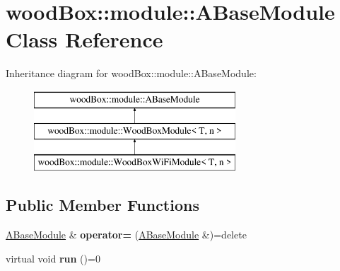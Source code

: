\hypertarget{classwood_box_1_1module_1_1_a_base_module}{}\section{wood\+Box\+:\+:module\+:\+:A\+Base\+Module Class Reference}
\label{classwood_box_1_1module_1_1_a_base_module}
Inheritance diagram for wood\+Box\+:\+:module\+:\+:A\+Base\+Module\+:\begin{figure}[H]
\begin{center}
\leavevmode
\includegraphics[height=3.000000cm]{classwood_box_1_1module_1_1_a_base_module}
\end{center}
\end{figure}
\subsection*{Public Member Functions}
\begin{DoxyCompactItemize}
\item 
\mbox{\label{classwood_box_1_1module_1_1_a_base_module_a61e8f78a69b3ea735e70a13f6de8d662}} 
\mbox{\hyperlink{classwood_box_1_1module_1_1_a_base_module}{A\+Base\+Module}} \& {\bfseries operator=} (\mbox{\hyperlink{classwood_box_1_1module_1_1_a_base_module}{A\+Base\+Module}} \&)=delete
\item 
\mbox{\label{classwood_box_1_1module_1_1_a_base_module_af1a4bde27dc757a4698f70d9773beddc}} 
virtual void {\bfseries run} ()=0
\end{DoxyCompactItemize}
